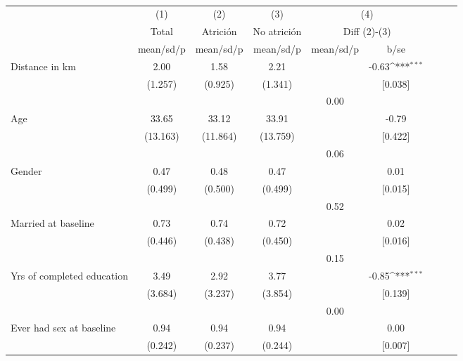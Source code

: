 \begin{table}[htbp]\centering
\def\sym#1{\ifmmode^{#1}\else\(^{#1}\)\fi}
\caption{}
\begin{tabular}{l*{4}{cc}}
\hline\hline
                &\multicolumn{1}{c}{(1)}&\multicolumn{1}{c}{(2)}&\multicolumn{1}{c}{(3)}&\multicolumn{2}{c}{(4)}     \\
                &\multicolumn{1}{c}{Total}&\multicolumn{1}{c}{Atrición}&\multicolumn{1}{c}{No atrición}&\multicolumn{2}{c}{Diff (2)-(3)}\\
                &mean/sd/p&mean/sd/p&mean/sd/p&mean/sd/p&     b/se         \\
\hline
Distance in km  &     2.00&     1.58&     2.21&         &    -0.63\sym{***}\\
                &  (1.257)&  (0.925)&  (1.341)&         &  [0.038]         \\
                &         &         &         &     0.00&                  \\
Age             &    33.65&    33.12&    33.91&         &    -0.79         \\
                & (13.163)& (11.864)& (13.759)&         &  [0.422]         \\
                &         &         &         &     0.06&                  \\
Gender          &     0.47&     0.48&     0.47&         &     0.01         \\
                &  (0.499)&  (0.500)&  (0.499)&         &  [0.015]         \\
                &         &         &         &     0.52&                  \\
Married at baseline&     0.73&     0.74&     0.72&         &     0.02         \\
                &  (0.446)&  (0.438)&  (0.450)&         &  [0.016]         \\
                &         &         &         &     0.15&                  \\
Yrs of completed education&     3.49&     2.92&     3.77&         &    -0.85\sym{***}\\
                &  (3.684)&  (3.237)&  (3.854)&         &  [0.139]         \\
                &         &         &         &     0.00&                  \\
Ever had sex at baseline&     0.94&     0.94&     0.94&         &     0.00         \\
                &  (0.242)&  (0.237)&  (0.244)&         &  [0.007]         \\

\end{tabular}
\end{table}
